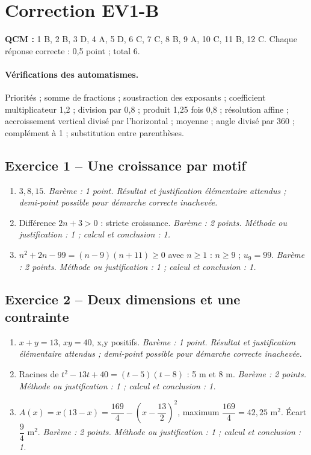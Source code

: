 \clearpage\section*{Correction EV1-B}\label{EV1-B-CORR}
\textbf{QCM :} 1 B, 2 B, 3 D, 4 A, 5 D, 6 C, 7 C, 8 B, 9 A, 10 C, 11 B, 12 C. Chaque réponse correcte : 0,5 point ; total 6.
\paragraph{Vérifications des automatismes.} Priorités ; somme de fractions ; soustraction des exposants ; coefficient multiplicateur 1,2 ; division par 0,8 ; produit 1,25 fois 0,8 ; résolution affine ; accroissement vertical divisé par l’horizontal ; moyenne ; angle divisé par 360 ; complément à 1 ; substitution entre parenthèses.
\subsection*{Exercice 1 -- Une croissance par motif}
\begin{enumerate}
\item $3,8,15$. \textit{Barème : 1 point. Résultat et justification élémentaire attendus ; demi-point possible pour démarche correcte inachevée.}
\item Différence $2n+3>0$ : stricte croissance. \textit{Barème : 2 points. Méthode ou justification : 1 ; calcul et conclusion : 1.}
\item $n^2+2n-99=(n-9)(n+11)\geq0$ avec $n\geq1$ : $n\geq9$ ; $u_9=99$. \textit{Barème : 2 points. Méthode ou justification : 1 ; calcul et conclusion : 1.}
\end{enumerate}
\subsection*{Exercice 2 -- Deux dimensions et une contrainte}
\begin{enumerate}
\item $x+y=13$, $xy=40$, x,y positifs. \textit{Barème : 1 point. Résultat et justification élémentaire attendus ; demi-point possible pour démarche correcte inachevée.}
\item Racines de $t^2-13t+40=(t-5)(t-8)$ : 5 m et 8 m. \textit{Barème : 2 points. Méthode ou justification : 1 ; calcul et conclusion : 1.}
\item $A(x)=x(13-x)=\dfrac{169}{4}-(x-\dfrac{13}{2})^2$, maximum $\dfrac{169}{4}=42{,}25$ m$^2$. Écart $\dfrac{9}{4}$ m$^2$. \textit{Barème : 2 points. Méthode ou justification : 1 ; calcul et conclusion : 1.}
\end{enumerate}
